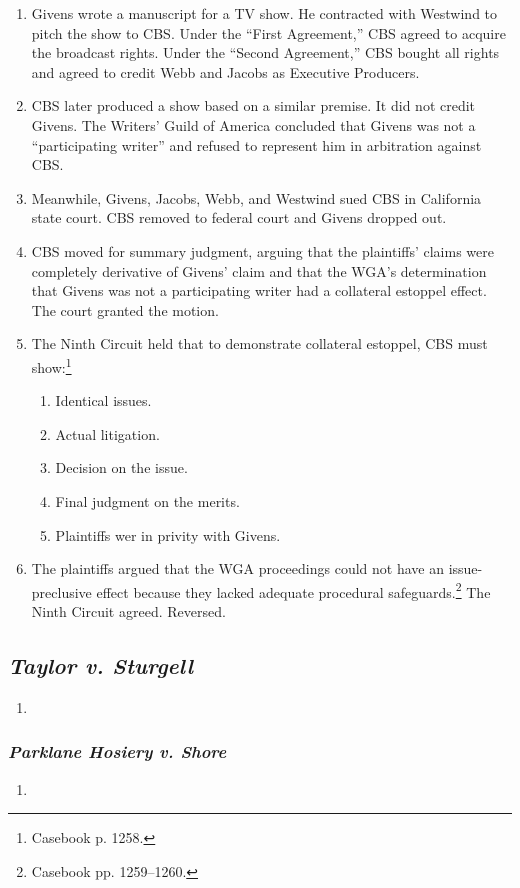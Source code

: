 \begin{enumerate}
    \item Givens wrote a manuscript for a TV show. He contracted with 
    Westwind to pitch the show to CBS. Under the ``First Agreement,'' CBS 
    agreed to acquire the broadcast rights. Under the ``Second Agreement,'' 
    CBS bought all rights and agreed to credit Webb and Jacobs as Executive 
    Producers.
    \item CBS later produced a show based on a similar premise. It did not 
    credit Givens. The Writers' Guild of America concluded that Givens was not 
    a ``participating writer'' and refused to represent him in arbitration 
    against CBS.
    \item Meanwhile, Givens, Jacobs, Webb, and Westwind sued CBS in California state 
    court. CBS removed to federal court and Givens dropped out.
    \item CBS moved for summary judgment, arguing that the plaintiffs' claims 
    were completely derivative of Givens' claim and that the WGA's 
    determination that Givens was not a participating writer had a collateral 
    estoppel effect. The court granted the motion.
    \item The Ninth Circuit held that to demonstrate collateral estoppel, CBS 
    must show:\footnote{Casebook p. 1258.}
    \begin{enumerate}
        \item Identical issues.
        \item Actual litigation.
        \item Decision on the issue.
        \item Final judgment on the merits.
        \item Plaintiffs wer in privity with Givens.
    \end{enumerate}
    \item The plaintiffs argued that the WGA proceedings could not have an 
    issue-preclusive effect because they lacked adequate procedural 
    safeguards.\footnote{Casebook pp. 1259--1260.} The Ninth Circuit agreed. 
    Reversed.
\end{enumerate}

\subsection{\emph{Taylor v. Sturgell}}

\begin{enumerate}
    \item %
\end{enumerate}

\subsubsection{\emph{Parklane Hosiery v. Shore}}

\begin{enumerate}
    \item %
\end{enumerate}
